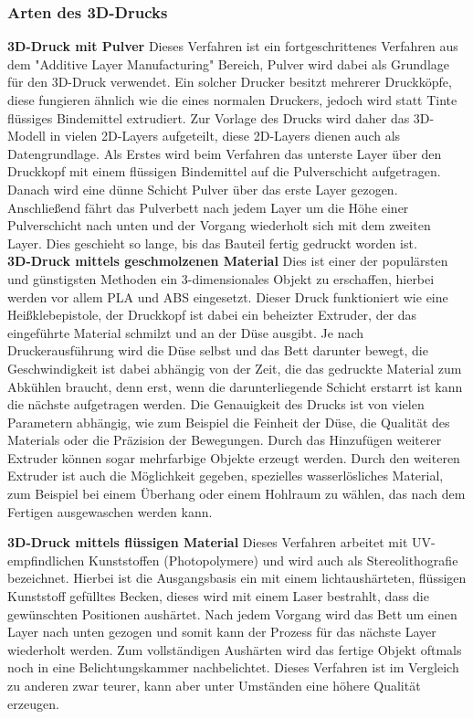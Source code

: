 \subsubsection{Arten des 3D-Drucks}
\textbf{3D-Druck mit Pulver}
Dieses Verfahren ist ein fortgeschrittenes Verfahren aus dem "Additive Layer Manufacturing" Bereich, Pulver wird dabei
als Grundlage für den 3D-Druck verwendet. Ein solcher Drucker besitzt mehrerer Druckköpfe, diese fungieren ähnlich wie
die eines normalen Druckers, jedoch wird statt Tinte flüssiges Bindemittel extrudiert. Zur Vorlage des Drucks wird daher das
3D-Modell in vielen 2D-Layers aufgeteilt, diese 2D-Layers dienen auch als Datengrundlage.
Als Erstes wird beim Verfahren das unterste Layer über den Druckkopf mit einem flüssigen Bindemittel auf die Pulverschicht
aufgetragen. Danach wird eine dünne Schicht Pulver über das erste Layer gezogen. Anschließend fährt
das Pulverbett nach jedem Layer um die Höhe einer Pulverschicht nach unten und der Vorgang wiederholt sich mit dem
zweiten Layer. Dies geschieht so lange, bis das Bauteil fertig gedruckt worden ist.\\

\textbf{3D-Druck mittels geschmolzenen Material}
Dies ist einer der populärsten und günstigsten Methoden ein 3-dimensionales Objekt zu erschaffen, hierbei werden vor allem PLA und
ABS eingesetzt. Dieser Druck funktioniert wie eine Heißklebepistole, der Druckkopf ist dabei ein beheizter Extruder, der
das eingeführte Material schmilzt und an der Düse ausgibt. Je nach Druckerausführung wird die Düse selbst und das Bett
darunter bewegt, die Geschwindigkeit ist dabei abhängig von der Zeit, die das gedruckte Material zum Abkühlen braucht,
denn erst, wenn die darunterliegende Schicht erstarrt ist kann die nächste aufgetragen werden. Die Genauigkeit des Drucks
ist von vielen Parametern abhängig, wie zum Beispiel die Feinheit der Düse, die Qualität des Materials oder die Präzision
der Bewegungen. Durch das Hinzufügen weiterer Extruder können sogar mehrfarbige Objekte erzeugt werden. Durch den
weiteren Extruder ist auch die Möglichkeit gegeben, spezielles wasserlösliches Material, zum Beispiel bei einem Überhang
oder einem Hohlraum zu wählen, das nach dem Fertigen ausgewaschen werden kann.

\textbf{3D-Druck mittels flüssigen Material}
Dieses Verfahren arbeitet mit UV-empfindlichen Kunststoffen (Photopolymere) und wird auch als Stereolithografie bezeichnet.
Hierbei ist die Ausgangsbasis ein mit einem lichtaushärteten, flüssigen Kunststoff gefülltes Becken, dieses wird mit
einem Laser bestrahlt, dass die gewünschten Positionen aushärtet. Nach jedem Vorgang wird das Bett um einen Layer nach
unten gezogen und somit kann der Prozess für das nächste Layer wiederholt werden. Zum vollständigen Aushärten wird
das fertige Objekt oftmals noch in eine Belichtungskammer nachbelichtet. Dieses Verfahren ist im Vergleich zu anderen
zwar teurer, kann aber unter Umständen eine höhere Qualität erzeugen. \\

